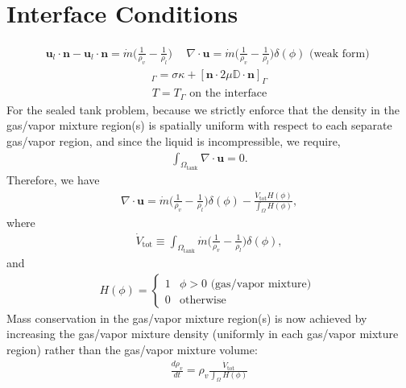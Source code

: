 \documentclass[]{article}
\begin{document}
\section*{ Interface Conditions } 
\begin{eqnarray*}
\bm{u}_l\cdot \bm{n}-\bm{u}_l\cdot \bm{n} = 
\dot{m}\big(\frac{1}{\rho_v}-\frac{1}{\rho_l}\big)
\hspace{15pt}
\nabla\cdot\bm{u} = 
\dot{m}\big(\frac{1}{\rho_v}-\frac{1}{\rho_l}\big)\delta(\phi) 
\mbox{ (weak form) }
\end{eqnarray*}
\begin{eqnarray*}
[p]_\Gamma = \sigma\kappa + [\bm{n}\cdot 2\mu\mathbb{D}\cdot\bm{n}]_\Gamma
\end{eqnarray*}
\begin{eqnarray*}
T = T_\Gamma \mbox{ on the interface}
\end{eqnarray*}
For the sealed tank problem, because we strictly enforce that the 
density in the gas/vapor mixture region(s)
is spatially uniform with respect to each
separate gas/vapor region, and since the liquid is 
incompressible, we require,
\begin{eqnarray*}
\displaystyle \int_{\Omega_{\textrm{tank}}} \nabla\cdot \bm{u} = 0.
\end{eqnarray*}
Therefore, we have
\begin{eqnarray*}
\displaystyle \nabla\cdot\bm{u} = 
\dot{m}\big(\frac{1}{\rho_v}-\frac{1}{\rho_l}\big)\delta(\phi) - 
\frac{\dot{V}_{\textrm{tot}} H(\phi)}{\int_{\Omega}H(\phi)},
\end{eqnarray*}
where
\begin{eqnarray*}
\displaystyle \dot{V}_{\textrm{tot}} \equiv 
\int_{\Omega_{\textrm{tank}}} 
\dot{m}\big(\frac{1}{\rho_v}-\frac{1}{\rho_l}\big)\delta(\phi),
\end{eqnarray*}
and
\begin{eqnarray*}
H(\phi)=\left\{ \begin{array}{cc}
 1 & \phi>0 \mbox{ (gas/vapor mixture) } \\
 0 & \textrm{otherwise}
 \end{array} \right.
\end{eqnarray*}
Mass conservation in the gas/vapor mixture region(s) 
is now achieved by increasing the
gas/vapor mixture density (uniformly in each gas/vapor mixture region) 
rather than the gas/vapor mixture volume:
\begin{eqnarray}
\frac{d\rho_{v}}{dt}=\rho_{v}\frac{\dot{V}_{\textrm{tot}}}{\int_{\Omega}H(\phi)}
\label{rho_v_ode}
\end{eqnarray}
\end{document}

